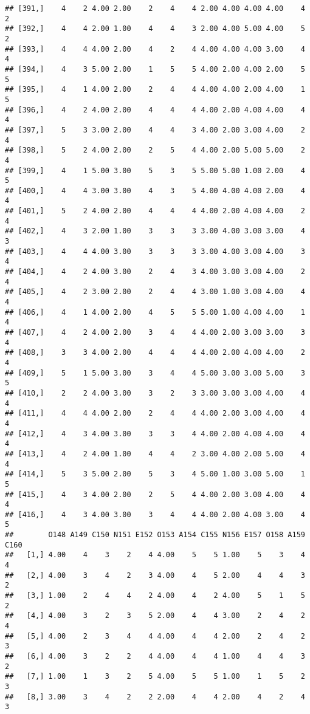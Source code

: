 \documentclass[]{article}
\begin{document}
\begin{verbatim}
## [391,]    4    2 4.00 2.00    2    4    4 2.00 4.00 4.00 4.00    4    2
## [392,]    4    4 2.00 1.00    4    4    3 2.00 4.00 5.00 4.00    5    2
## [393,]    4    4 4.00 2.00    4    2    4 4.00 4.00 4.00 3.00    4    4
## [394,]    4    3 5.00 2.00    1    5    5 4.00 2.00 4.00 2.00    5    5
## [395,]    4    1 4.00 2.00    2    4    4 4.00 4.00 2.00 4.00    1    5
## [396,]    4    2 4.00 2.00    4    4    4 4.00 2.00 4.00 4.00    4    4
## [397,]    5    3 3.00 2.00    4    4    3 4.00 2.00 3.00 4.00    2    4
## [398,]    5    2 4.00 2.00    2    5    4 4.00 2.00 5.00 5.00    2    4
## [399,]    4    1 5.00 3.00    5    3    5 5.00 5.00 1.00 2.00    4    5
## [400,]    4    4 3.00 3.00    4    3    5 4.00 4.00 4.00 2.00    4    4
## [401,]    5    2 4.00 2.00    4    4    4 4.00 2.00 4.00 4.00    2    4
## [402,]    4    3 2.00 1.00    3    3    3 3.00 4.00 3.00 3.00    4    3
## [403,]    4    4 4.00 3.00    3    3    3 3.00 4.00 3.00 4.00    3    4
## [404,]    4    2 4.00 3.00    2    4    3 4.00 3.00 3.00 4.00    2    4
## [405,]    4    2 3.00 2.00    2    4    4 3.00 1.00 3.00 4.00    4    4
## [406,]    4    1 4.00 2.00    4    5    5 5.00 1.00 4.00 4.00    1    4
## [407,]    4    2 4.00 2.00    3    4    4 4.00 2.00 3.00 3.00    3    4
## [408,]    3    3 4.00 2.00    4    4    4 4.00 2.00 4.00 4.00    2    4
## [409,]    5    1 5.00 3.00    3    4    4 5.00 3.00 3.00 5.00    3    5
## [410,]    2    2 4.00 3.00    3    2    3 3.00 3.00 3.00 4.00    4    4
## [411,]    4    4 4.00 2.00    2    4    4 4.00 2.00 3.00 4.00    4    4
## [412,]    4    3 4.00 3.00    3    3    4 4.00 2.00 4.00 4.00    4    4
## [413,]    4    2 4.00 1.00    4    4    2 3.00 4.00 2.00 5.00    4    4
## [414,]    5    3 5.00 2.00    5    3    4 5.00 1.00 3.00 5.00    1    5
## [415,]    4    3 4.00 2.00    2    5    4 4.00 2.00 3.00 4.00    4    4
## [416,]    4    3 4.00 3.00    3    4    4 4.00 2.00 4.00 3.00    4    5
##        O148 A149 C150 N151 E152 O153 A154 C155 N156 E157 O158 A159 C160
##   [1,] 4.00    4    3    2    4 4.00    5    5 1.00    5    3    4    4
##   [2,] 4.00    3    4    2    3 4.00    4    5 2.00    4    4    3    2
##   [3,] 1.00    2    4    4    2 4.00    4    2 4.00    5    1    5    2
##   [4,] 4.00    3    2    3    5 2.00    4    4 3.00    2    4    2    4
##   [5,] 4.00    2    3    4    4 4.00    4    4 2.00    2    4    2    3
##   [6,] 4.00    3    2    2    4 4.00    4    4 1.00    4    4    3    2
##   [7,] 1.00    1    3    2    5 4.00    5    5 1.00    1    5    2    3
##   [8,] 3.00    3    4    2    2 2.00    4    4 2.00    4    2    4    3

\end{verbatim}
\end{document}

